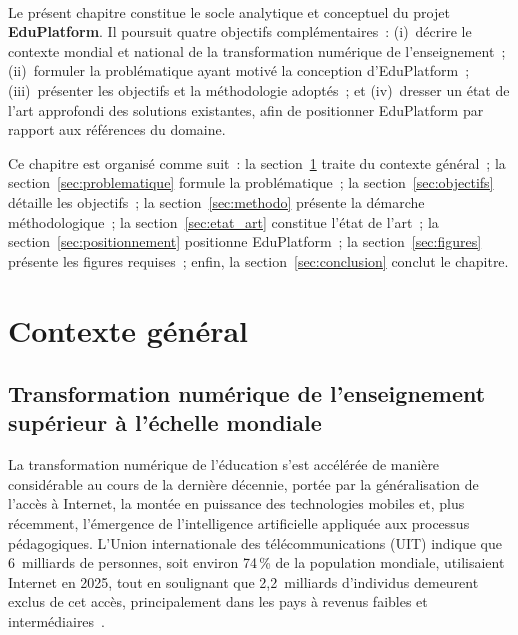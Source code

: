 ﻿﻿\documentclass[12pt,a4paper,oneside]{report}
\begin{document}
Le pr\'esent chapitre constitue le socle analytique et conceptuel du projet \textbf{EduPlatform}. Il poursuit quatre objectifs compl\'ementaires~: (i)~d\'ecrire le contexte mondial et national de la transformation num\'erique de l'enseignement~; (ii)~formuler la probl\'ematique ayant motiv\'e la conception d'EduPlatform~; (iii)~pr\'esenter les objectifs et la m\'ethodologie adopt\'es~; et (iv)~dresser un \'etat de l'art approfondi des solutions existantes, afin de positionner EduPlatform par rapport aux r\'ef\'erences du domaine.

Ce chapitre est organis\'e comme suit~: la section~\ref{sec:contexte} traite du contexte g\'en\'eral~; la section~\ref{sec:problematique} formule la probl\'ematique~; la section~\ref{sec:objectifs} d\'etaille les objectifs~; la section~\ref{sec:methodo} pr\'esente la d\'emarche m\'ethodologique~; la section~\ref{sec:etat_art} constitue l'\'etat de l'art~; la section~\ref{sec:positionnement} positionne EduPlatform~; la section~\ref{sec:figures} pr\'esente les figures requises~; enfin, la section~\ref{sec:conclusion} conclut le chapitre.

\section{Contexte g\'en\'eral}
\label{sec:contexte}

\subsection{Transformation num\'erique de l'enseignement sup\'erieur \`a l'\'echelle mondiale}

La transformation num\'erique de l'\'education s'est acc\'el\'er\'ee de mani\`ere consid\'erable au cours de la derni\`ere d\'ecennie, port\'ee par la g\'en\'eralisation de l'acc\`es \`a Internet, la mont\'ee en puissance des technologies mobiles et, plus r\'ecemment, l'\'emergence de l'intelligence artificielle appliqu\'ee aux processus p\'edagogiques. L'Union internationale des t\'el\'ecommunications (UIT) indique que 6~milliards de personnes, soit environ 74\,\% de la population mondiale, utilisaient Internet en 2025, tout en soulignant que 2,2~milliards d'individus demeurent exclus de cet acc\`es, principalement dans les pays \`a revenus faibles et interm\'ediaires~\cite{itu_facts_2025}.
\end{document}
